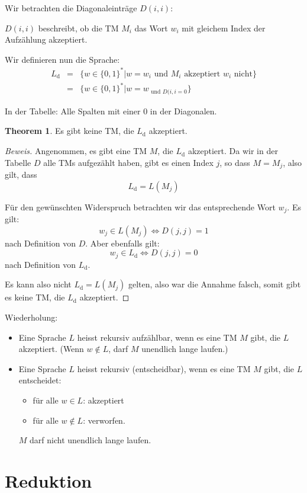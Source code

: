 \documentclass[11pt]{article} %
\theoremstyle{definition}
\newtheorem{theorem}{Theorem}
\begin{document}
Wir betrachten die Diagonaleinträge $D(i,i)$:

$D(i,i)$ beschreibt, ob die TM $M_i$ das Wort $w_i$ mit gleichem Index der Aufzählung akzeptiert.

Wir definieren nun die Sprache:
\begin{eqnarray*}
L_\textrm{d} &=& \{ w \in \{0,1\}^* | w = w_i \textrm{ und $M_i$ akzeptiert $w_i$ nicht} \} \\
&=& \{ w\in \{0,1\}^* | w = w_\textrm{ und $D(i,i = 0$} \}
\end{eqnarray*}

In der Tabelle: Alle Spalten mit einer 0 in der Diagonalen.

\begin{theorem}
Es gibt keine TM, die $L_\textrm{d}$ akzeptiert.
\end{theorem}
\begin{proof}[Beweis]
Angenommen, es gibt eine TM $M$, die $L_\textrm{d}$ akzeptiert. Da wir in der Tabelle $D$ alle TMs aufgezählt haben, gibt es einen Index $j$, so dass $M = M_j$, also gilt, dass
\[
L_\textrm{d} = L(M_j)
\]

Für den gewünschten Widerspruch betrachten wir das entsprechende Wort $w_j$. Es gilt:
\[
w_j \in L(M_j) \Leftrightarrow D(j,j) = 1
\]
nach Definition von $D$. Aber ebenfalls gilt:
\[
w_j \in L_\textrm{d} \Leftrightarrow D(j,j) = 0
\]
nach Definition von $L_\textrm{d}$.

Es kann also nicht $L_\textrm{d} = L(M_j)$ gelten, also war die Annahme falsch, somit gibt es keine TM, die $L_\textrm{d}$ akzeptiert.

\end{proof}

Wiederholung:
\begin{itemize}
\item Eine Sprache $L$ heisst rekursiv aufzählbar, wenn es eine TM $M$ gibt, die $L$ akzeptiert. (Wenn $w \notin L$, darf $M$ unendlich lange laufen.)
\item Eine Sprache $L$ heisst rekursiv (entscheidbar), wenn es eine TM $M$ gibt, die $L$ entscheidet:
\begin{itemize}
\item für alle $w\in L$: akzeptiert
\item für alle $w \notin L$: verworfen.
\end{itemize}
$M$ darf nicht unendlich lange laufen.
\end{itemize}

\section{Reduktion}
\end{document}
